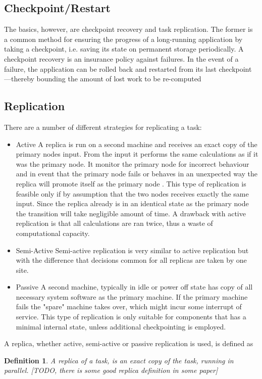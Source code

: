\documentclass{cslthse-msc}
\newtheorem{definition}{Definition}[chapter]
\begin{document}
\subsection{Checkpoint/Restart}
The basics, however, are checkpoint recovery and task replication. The former is a common method for ensuring the progress of a long-running application by taking a checkpoint, i.e. saving its state on permanent storage periodically. A checkpoint recovery is an insurance policy against failures. In the event of a failure, the application can be rolled back and restarted from its last checkpoint—thereby bounding the amount of lost work to be re-computed \cite{effTaskReplMobGrid}

\subsection{Replication}
There are a number of different strategies for replicating a task:
\begin{itemize}
\item Active A replica is run on a second machine and receives an exact copy of the primary nodes input. From the input it performs the same calculations as if it was the primary node. It monitor the primary node for incorrect behaviour and in event that the primary node fails or behaves in an unexpected way the replica will promote itself as the primary node \cite{surveyFaultParallel}. This type of replication is feasible only if by assumption that the two nodes receives exactly the same input. Since the replica already is in an identical state as the primary node the transition will take negligible amount of time. A drawback with active replication is that all calculations are ran twice, thus a waste of computational capacity. 
\item Semi-Active Semi-active replication is very similar to active replication but with the difference that decisions common for all replicas are taken by one site.
\item Passive A second machine, typically in idle or power off state has  copy of all necessary system software as the primary machine. If the primary machine fails the "spare" machine takes over, which might incur some interrupt of service. This type of replication is only suitable for components that has a minimal internal state, unless additional checkpointing is employed.
\end{itemize}

A replica, whether active, semi-active or passive replication is used, is defined as
\begin{definition} \label{def:replica}
A replica of a task, is an exact copy of the task, running in parallel. [TODO, there is some good replica definition in some paper]
\end{definition}
\end{document}
